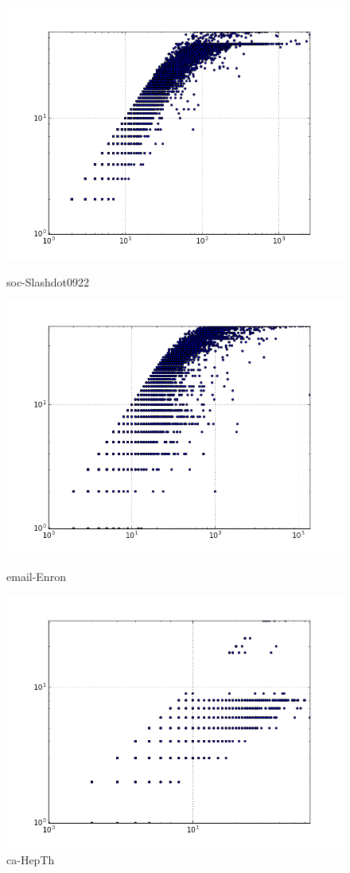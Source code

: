 \begin{figure}[H]
  \includegraphics[width=\linewidth]{img/slashDot09/degreeVSkcore.png}
  \caption*{soc-Slashdot0922}
\endminipage\hfill
{}
  \includegraphics[width=\linewidth]{img/email/degreeVSkcore.png}
  \caption*{email-Enron}
\endminipage\hfill
{}
  \includegraphics[width=\linewidth]{img/ca-HepTh/degreeVSkcore.png}
  \caption*{ca-HepTh}
\endminipage
\end{figure}
